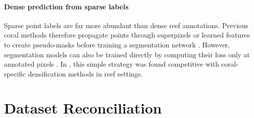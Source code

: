 \documentclass[10pt,twocolumn,letterpaper]{article}
\begin{document}
\paragraph{Dense prediction from sparse labels}


Sparse point labels are far more abundant than dense reef annotations. Previous coral methods therefore propagate points through superpixels or learned features to create pseudo-masks before training a segmentation network \citep{alonso2017coralsegmentation,alonso2019coralseg,raine2022plas,raine2026hil}. However, segmentation models can also be trained directly by computing their loss only at annotated pixels \citep{bearman2016point,tang2018regularized}. In \citep{sauder2025coralscapes}, this simple strategy was found competitive with coral-specific densification methods in reef settings. %

\section{Dataset Reconciliation}
\end{document}
